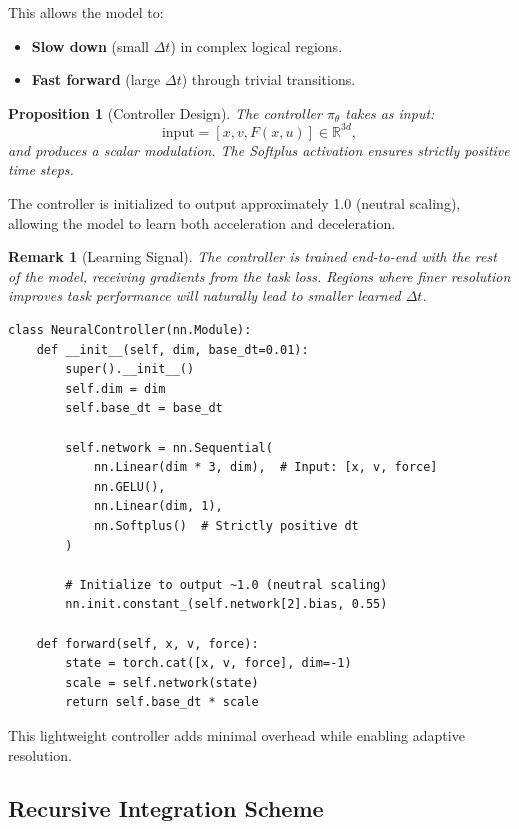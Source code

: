 \documentclass[12pt,letterpaper,twoside]{article}
\newtheorem{remarque}{Remark}[section]
\newtheorem{prop}{Proposition}[section]
\begin{document}
This allows the model to:
\begin{itemize}
\item \textbf{Slow down} (small $\Delta t$) in complex logical regions.
\item \textbf{Fast forward} (large $\Delta t$) through trivial transitions.
\end{itemize}

\begin{prop}[Controller Design]
The controller $\pi_\theta$ takes as input:
\[
\text{input} = [x, v, F(x, u)] \in \mathbb{R}^{3d},
\]
and produces a scalar modulation. The Softplus activation ensures strictly positive time steps.
\end{prop}

The controller is initialized to output approximately 1.0 (neutral scaling), allowing the model to learn both acceleration and deceleration.

\begin{remarque}[Learning Signal]
The controller is trained end-to-end with the rest of the model, receiving gradients from the task loss. Regions where finer resolution improves task performance will naturally lead to smaller learned $\Delta t$.
\end{remarque}

\begin{verbatim}
class NeuralController(nn.Module):
    def __init__(self, dim, base_dt=0.01):
        super().__init__()
        self.dim = dim
        self.base_dt = base_dt
        
        self.network = nn.Sequential(
            nn.Linear(dim * 3, dim),  # Input: [x, v, force]
            nn.GELU(),
            nn.Linear(dim, 1),
            nn.Softplus()  # Strictly positive dt
        )
        
        # Initialize to output ~1.0 (neutral scaling)
        nn.init.constant_(self.network[2].bias, 0.55)
    
    def forward(self, x, v, force):
        state = torch.cat([x, v, force], dim=-1)
        scale = self.network(state)
        return self.base_dt * scale
\end{verbatim}

This lightweight controller adds minimal overhead while enabling adaptive resolution.

\subsection{Recursive Integration Scheme}
\end{document}
